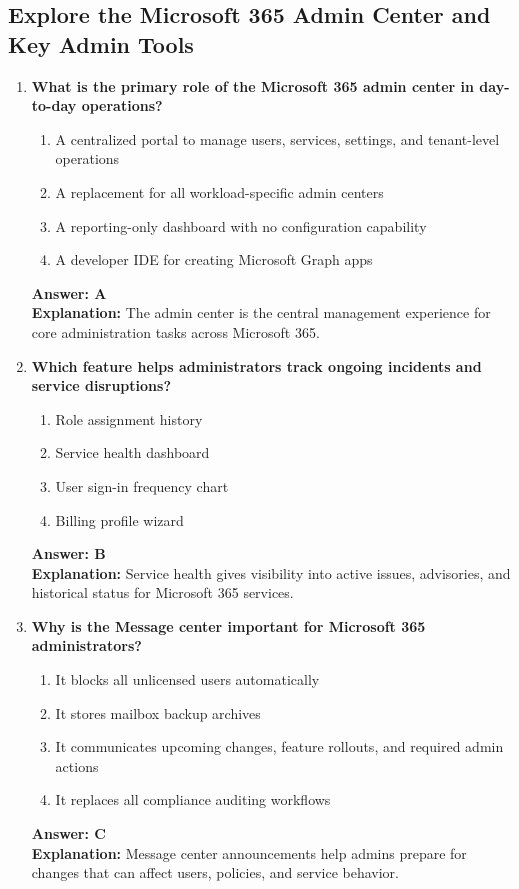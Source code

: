 \documentclass[10pt]{article}
\begin{document}
\subsection{Explore the Microsoft 365 Admin Center and Key Admin Tools}
\begin{enumerate}[leftmargin=*]

\item \textbf{What is the primary role of the Microsoft 365 admin center in day-to-day operations?}
\begin{enumerate}[label=\Alph*.]
  \item A centralized portal to manage users, services, settings, and tenant-level operations
  \item A replacement for all workload-specific admin centers
  \item A reporting-only dashboard with no configuration capability
  \item A developer IDE for creating Microsoft Graph apps
\end{enumerate}
\textbf{Answer: A}\\
\textbf{Explanation:} The admin center is the central management experience for core administration tasks across Microsoft 365.

\item \textbf{Which feature helps administrators track ongoing incidents and service disruptions?}
\begin{enumerate}[label=\Alph*.]
  \item Role assignment history
  \item Service health dashboard
  \item User sign-in frequency chart
  \item Billing profile wizard
\end{enumerate}
\textbf{Answer: B}\\
\textbf{Explanation:} Service health gives visibility into active issues, advisories, and historical status for Microsoft 365 services.

\item \textbf{Why is the Message center important for Microsoft 365 administrators?}
\begin{enumerate}[label=\Alph*.]
  \item It blocks all unlicensed users automatically
  \item It stores mailbox backup archives
  \item It communicates upcoming changes, feature rollouts, and required admin actions
  \item It replaces all compliance auditing workflows
\end{enumerate}
\textbf{Answer: C}\\
\textbf{Explanation:} Message center announcements help admins prepare for changes that can affect users, policies, and service behavior.


\end{enumerate}
\end{document}
